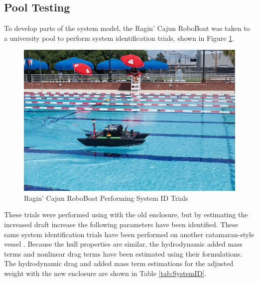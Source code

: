 \documentclass[letterpaper, 12 pt, conference]{ieeeconf}
\begin{document}
\subsection{Pool Testing}
To develop parts of the system model, the Ragin' Cajun RoboBoat was taken to a university pool to perform system identification trials, shown in Figure \ref{fig:PoolTesting}.
%
\begin{figure}[tb]
\centering
\vspace{0.05in}
\includegraphics[width=\columnwidth]{Figures/PoolTesting.jpg}
\caption{Ragin' Cajun RoboBoat Performing System ID Trials}
\label{fig:PoolTesting}
\end{figure}
%
These trials were performed using with the old enclosure, but by estimating the increased draft increase the following parameters have been identified. These same system identification trials have been performed on another catamaran-style vessel \cite{Klinger:17a, Sarda:16a}. Because the hull properties are similar, the hydrodynamic added mass terms and nonlinear drag terms have been estimated using their formulations. The  hydrodynamic drag and added mass term estimations for the adjusted weight with the new enclosure are shown in Table \ref{tab:SystemID}.
%
\end{document}
